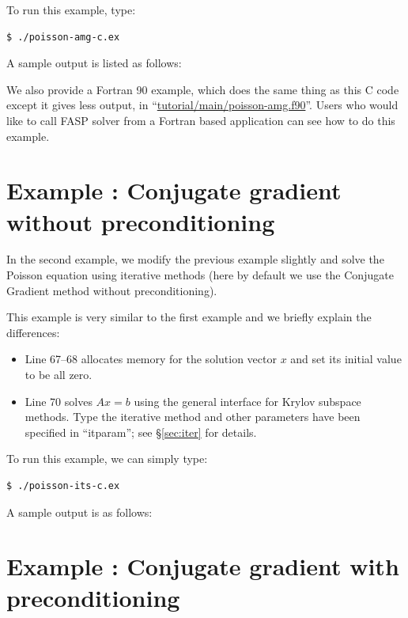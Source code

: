 \documentclass[11pt]{memoir}
\begin{document}
%
To run this example, type:
%
\begin{lstlisting}[numbers=none]
$ ./poisson-amg-c.ex
\end{lstlisting}
%
A sample output is listed as follows:
%


We also provide a Fortran 90 example, which does the same thing as
this C code except it gives less output, in
``\url{tutorial/main/poisson-amg.f90}''. Users who would like to call
FASP solver from a Fortran based application can see how to do this example.
%

%

\section{Example : Conjugate gradient without preconditioning}\label{sec:ex2}
\addtocounter{ex}{1}
In the second example, we modify the previous example slightly and
solve the Poisson equation using iterative methods (here by default we
use the Conjugate Gradient method without preconditioning).
%

%
This example is very similar to the first example and we briefly explain the differences:
\begin{itemize}
%
\item Line 67--68 allocates memory for the solution vector $x$ and set its initial value to be all zero.
%
\item Line 70 solves $Ax=b$ using the general interface for Krylov subspace methods. Type the iterative method and other parameters have been specified in ``itparam''; see \S\ref{sec:iter} for details.
%
\end{itemize}
%
To run this example, we can simply type:
%
\begin{lstlisting}[numbers=none,language=sh]
$ ./poisson-its-c.ex
\end{lstlisting}
%
A sample output is as follows:


\section{Example : Conjugate gradient with preconditioning}\label{sec:ex3}
\addtocounter{ex}{1}
\end{document}
